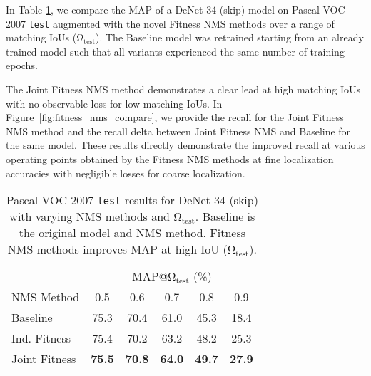 \documentclass[10pt,twocolumn,letterpaper]{article}
\begin{document}
\begin{figure*}[tb]
{}
\caption{VOC 2007 \texttt{test} recall with DeNet-34: (a) with Joint Fitness NMS, and (b) delta obtain by switching from Joint Fitness NMS to standard NMS. We varied the clustering IoU to obtain the desired number of detections (\#D). Improved recall with IoU $>$ 0.6 was observed with Joint Fitness NMS enabled, peaking at approx. +5\% as $\bm{\mathrm{\Omega_{test}}}=0.9$.} 
\label{fig:fitness_nms_compare}
\end{figure*}


In Table \ref{table:voc_fitness}, we compare the MAP of a DeNet-34 (skip) model on Pascal VOC 2007 \texttt{test} augmented with the novel Fitness NMS methods over a range of matching IoUs ($\bm{\mathrm{\Omega_{test}}}$). The Baseline model was retrained starting from an already trained model such that all variants experienced the same number of training epochs.

The Joint Fitness NMS method demonstrates a clear lead at high matching IoUs with no observable loss for low matching IoUs. In Figure~\ref{fig:fitness_nms_compare}, we provide the recall for the Joint Fitness NMS method and the recall delta between Joint Fitness NMS and Baseline for the same model. These results directly demonstrate the improved recall at various operating points obtained by the Fitness NMS methods at fine localization accuracies with negligible losses for coarse localization. 

\begin{table}[tb]
\begin{center}
\begin{tabular}{l|c|c|c|c|c}
& \multicolumn{5}{|c}{MAP@$\bm{\mathrm{\Omega_{test}}}$ (\%) }\\  
NMS Method & 0.5 & 0.6 & 0.7 & 0.8 & 0.9 \\
\hline
Baseline & 75.3 & 70.4 & 61.0 & 45.3 & 18.4 \\
Ind. Fitness & 75.4 & 70.2 & 63.2 & 48.2 & 25.3 \\
Joint Fitness & \textbf{75.5} & \textbf{70.8} & \textbf{64.0} & \textbf{49.7} & \textbf{27.9}
\end{tabular}
\end{center}
\caption{ Pascal VOC 2007 \texttt{test} results for DeNet-34 (skip) with varying NMS methods and $\bm{\mathrm{\Omega_{test}}}$. Baseline is the original model and NMS method. Fitness NMS methods improves MAP at high IoU ($\bm{\mathrm{\Omega_{test}}}$).}
\label{table:voc_fitness}
\end{table}
\end{document}
